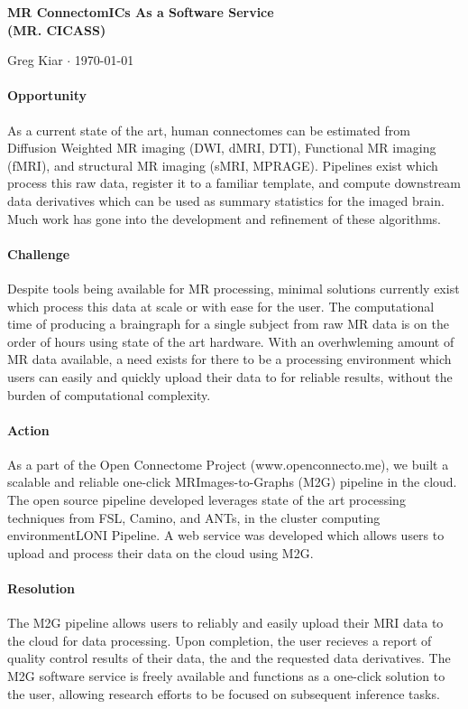 \documentclass[12pt]{article}
\begin{document}
\begin{center}\Large \bf MR ConnectomICs As a Software Service\\ (MR. CICASS) \end{center}
\begin{center} Greg Kiar $\cdot$  \today \end{center}
\bigskip

\paragraph{Opportunity}
As a current state of the art, human connectomes can be estimated from Diffusion Weighted MR imaging (DWI, dMRI, DTI), Functional MR imaging (fMRI), and structural MR imaging (sMRI, MPRAGE). Pipelines exist which process this raw data, register it to a familiar template, and compute downstream data derivatives which can be used as summary statistics for the imaged brain. Much work has gone into the development and refinement of these algorithms.
\paragraph{Challenge}
Despite tools being available for MR processing, minimal solutions currently exist which process this data at scale or with ease for the user. The computational time of producing a braingraph for a single subject from raw MR data is on the order of hours using state of the art hardware. With an overhwleming amount of MR data available, a need exists for there to be a processing environment which users can easily and quickly upload their data to for reliable results, without the burden of computational complexity.
\paragraph{Action}
As a part of the Open Connectome Project (www.openconnecto.me), we built a scalable and reliable one-click MRImages-to-Graphs (M2G) pipeline in the cloud. The open source pipeline developed leverages state of the art processing techniques from FSL, Camino, and ANTs, in the cluster computing environmentLONI Pipeline. A web service was developed which allows users to upload and process their data on the cloud using M2G.
\paragraph{Resolution}
The M2G pipeline allows users to reliably and easily upload their MRI data to the cloud for data processing. Upon completion, the user recieves a report of quality control results of their data, the and the requested data derivatives. The M2G software service is freely available and functions as a one-click solution to the user, allowing research efforts to be focused on subsequent inference tasks.
\end{document}

